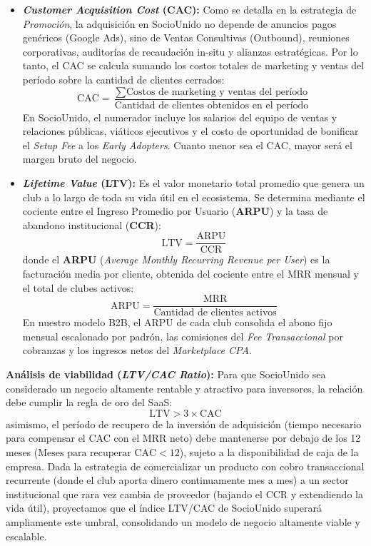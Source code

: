 \begin{itemize}
    \item \textbf{\textit{Customer Acquisition Cost} (CAC):} Como se detalla en la estrategia de \textit{Promoción}, la adquisición en SocioUnido no depende de anuncios pagos genéricos (Google Ads), sino de Ventas Consultivas (Outbound), reuniones corporativas, auditorías de recaudación in-situ y alianzas estratégicas. Por lo tanto, el CAC se calcula sumando los costos totales de marketing y ventas del período sobre la cantidad de clientes cerrados:
    \begin{equation}
        \text{CAC} = \frac{\sum \text{Costos de marketing y ventas del período}}{\text{Cantidad de clientes obtenidos en el período}}
    \end{equation}
    En SocioUnido, el numerador incluye los salarios del equipo de ventas y relaciones públicas, viáticos ejecutivos y el costo de oportunidad de bonificar el \textit{Setup Fee} a los \textit{Early Adopters}. Cuanto menor sea el CAC, mayor será el margen bruto del negocio.
    
    \item \textbf{\textit{Lifetime Value} (LTV):} Es el valor monetario total promedio que genera un club a lo largo de toda su vida útil en el ecosistema. Se determina mediante el cociente entre el Ingreso Promedio por Usuario (\textbf{ARPU}) y la tasa de abandono institucional (\textbf{CCR}):
    \begin{equation}
        \text{LTV} = \frac{\text{ARPU}}{\text{CCR}}
    \end{equation}
    donde el \textbf{ARPU} (\textit{Average Monthly Recurring Revenue per User}) es la facturación media por cliente, obtenida del cociente entre el MRR mensual y el total de clubes activos:
    \begin{equation}
        \text{ARPU} = \frac{\text{MRR}}{\text{Cantidad de clientes activos}}
    \end{equation}
    En nuestro modelo B2B, el ARPU de cada club consolida el abono fijo mensual escalonado por padrón, las comisiones del \textit{Fee Transaccional} por cobranzas y los ingresos netos del \textit{Marketplace CPA}.
\end{itemize}

\textbf{Análisis de viabilidad (\textit{LTV/CAC Ratio}):}
Para que SocioUnido sea considerado un negocio altamente rentable y atractivo para inversores, la relación debe cumplir la regla de oro del SaaS:
\begin{equation}
    \text{LTV} > 3 \times \text{CAC}
\end{equation}
asimismo, el período de recupero de la inversión de adquisición (tiempo necesario para compensar el CAC con el MRR neto) debe mantenerse por debajo de los 12 meses ($\text{Meses para recuperar CAC} < 12$), sujeto a la disponibilidad de caja de la empresa. 
Dada la estrategia de comercializar un producto con cobro transaccional recurrente (donde el club aporta dinero continuamente mes a mes) a un sector institucional que rara vez cambia de proveedor (bajando el CCR y extendiendo la vida útil), proyectamos que el índice LTV/CAC de SocioUnido superará ampliamente este umbral, consolidando un modelo de negocio altamente viable y escalable.

